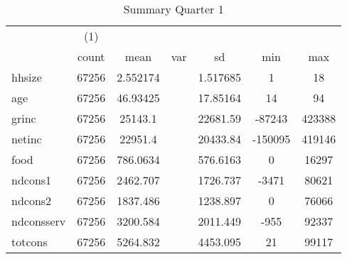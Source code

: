 \begin{table}[htbp]\centering
\def\sym#1{\ifmmode^{#1}\else\(^{#1}\)\fi}
\caption{Summary Quarter 1 \label{sum\_Q1}}
\begin{tabular}{l*{1}{cccccc}}
\hline\hline
            &\multicolumn{1}{c}{(1)}&            &            &            &            &            \\
            &       count&        mean&         var&          sd&         min&         max\\
\hline
hhsize      &       67256&    2.552174&            &    1.517685&           1&          18\\
age         &       67256&    46.93425&            &    17.85164&          14&          94\\
grinc       &       67256&     25143.1&            &    22681.59&      -87243&      423388\\
netinc      &       67256&     22951.4&            &    20433.84&     -150095&      419146\\
food        &       67256&    786.0634&            &    576.6163&           0&       16297\\
ndcons1     &       67256&    2462.707&            &    1726.737&       -3471&       80621\\
ndcons2     &       67256&    1837.486&            &    1238.897&           0&       76066\\
ndconsserv  &       67256&    3200.584&            &    2011.449&        -955&       92337\\
totcons     &       67256&    5264.832&            &    4453.095&          21&       99117\\
\hline\hline
\end{tabular}
\end{table}
